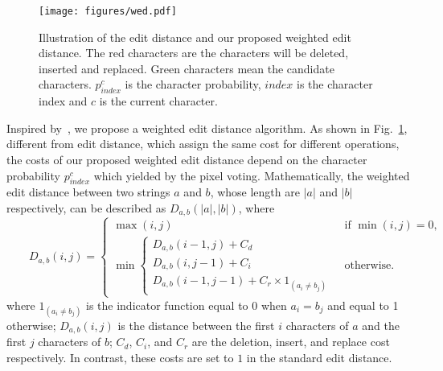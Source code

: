 \documentclass[runningheads]{llncs}
\begin{document}
\begin{figure}[!bp]
\begin{center}
\texttt{[image: figures/wed.pdf]}
\end{center}
\caption{Illustration of the edit distance and our proposed weighted edit distance. The red characters are the characters will be deleted, inserted and replaced. Green characters mean the candidate characters. $p_{index}^c$ is the character probability, $index$ is the character index and $c$ is the current character.}
\label{fig:wed}
\end{figure}

Inspired by~\cite{yao2014unified}, we propose a weighted edit distance algorithm. As shown in Fig.~\ref{fig:wed}, different from edit distance,  which assign the same cost for different operations, the costs of our proposed weighted edit distance depend on the character probability $p_{index}^c$ which yielded by the pixel voting. Mathematically, the weighted edit distance between two strings $a$ and $b$, whose length are $|a|$ and $|b|$ respectively, can be described as $D_{a,b}(|a|,|b|)$, where
\begin{equation}{\qquad D_{a,b}(i,j)={\begin{cases}\max(i,j)&{\text{ if }}\min(i,j)=0,\\\min {\begin{cases} D_{a,b}(i-1,j)+C_d\\ D_{a,b}(i,j-1)+C_i\\ D_{a,b}(i-1,j-1)+C_r \times 1_{(a_{i}\neq b_{j})}\end{cases}}&{\text{ otherwise.}}\end{cases}}}
\end{equation}
where $1_{(a_{i}\neq b_{j})}$ is the indicator function equal to 0 when $a_{i}=b_{j}$ and equal to 1 otherwise; $D_{a,b}(i,j)$ is the distance between the first $i$ characters of $a$ and the first $j$ characters of $b$; $C_d$, $C_i$, and $C_r$ are the deletion, insert, and replace cost respectively. In contrast, these costs are set to $1$ in the standard edit distance.
\end{document}
